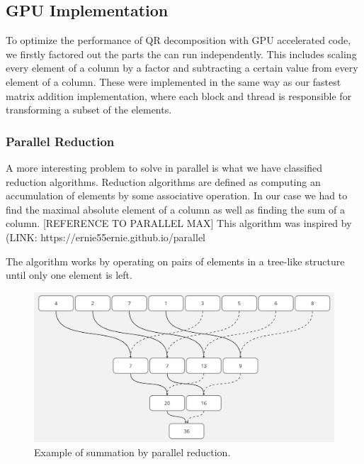 \subsection{GPU Implementation} 

To optimize the performance of QR decomposition with GPU accelerated code, we firstly factored out the parts the can run independently. This includes scaling every element of a column by a factor and subtracting a certain value from every element of a column. These were implemented in the same way as our fastest matrix addition implementation, where each block and thread is responsible for transforming a subset of the elements. 

\subsubsection{Parallel Reduction}
A more interesting problem to solve in parallel is what we have classified reduction algorithms. Reduction algorithms are defined as computing an accumulation of elements by some associative operation. In our case we had to find the maximal absolute element of a column as well as finding the sum of a column. [REFERENCE TO PARALLEL MAX]
This algorithm was inspired by (LINK: https://ernie55ernie.github.io/parallel%

The algorithm works by operating on pairs of elements in a tree-like structure until only one element is left. 

\begin{figure}[ht]
\includegraphics[width=\textwidth]{Documents/Report/Figures/parallel_sum.png}
\caption{Example of summation by parallel reduction.}
\label{fig:threads and blocks}
\end{figure}

